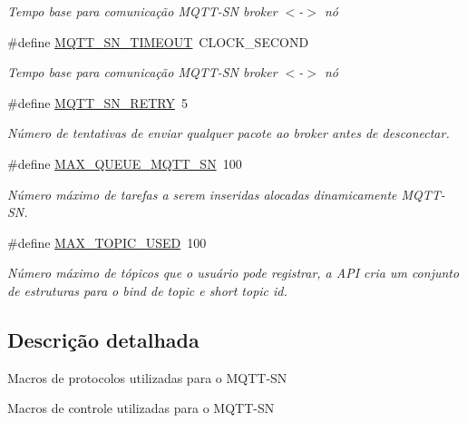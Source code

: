 \begin{DoxyCompactItemize}
\begin{DoxyCompactList}\small\item\em Tempo base para comunicação M\+Q\+T\+T-\/\+S\+N broker $<$-\/$>$ nó \end{DoxyCompactList}\item 
\hypertarget{group__MQTT__SN__CONTROL_ga47da8d46176b160b0db00fe221725d4c}{\#define \hyperlink{group__MQTT__SN__CONTROL_ga47da8d46176b160b0db00fe221725d4c}{M\+Q\+T\+T\+\_\+\+S\+N\+\_\+\+T\+I\+M\+E\+O\+U\+T}~C\+L\+O\+C\+K\+\_\+\+S\+E\+C\+O\+N\+D}\label{group__MQTT__SN__CONTROL_ga47da8d46176b160b0db00fe221725d4c}

\begin{DoxyCompactList}\small\item\em Tempo base para comunicação M\+Q\+T\+T-\/\+S\+N broker $<$-\/$>$ nó \end{DoxyCompactList}\item 
\hypertarget{group__MQTT__SN__CONTROL_gaad5ac7de3008d8fa37447193aebc31e2}{\#define \hyperlink{group__MQTT__SN__CONTROL_gaad5ac7de3008d8fa37447193aebc31e2}{M\+Q\+T\+T\+\_\+\+S\+N\+\_\+\+R\+E\+T\+R\+Y}~5}\label{group__MQTT__SN__CONTROL_gaad5ac7de3008d8fa37447193aebc31e2}

\begin{DoxyCompactList}\small\item\em Número de tentativas de enviar qualquer pacote ao broker antes de desconectar. \end{DoxyCompactList}\item 
\hypertarget{group__MQTT__SN__CONTROL_ga45ab5881e190d570f3784e50be2cce65}{\#define \hyperlink{group__MQTT__SN__CONTROL_ga45ab5881e190d570f3784e50be2cce65}{M\+A\+X\+\_\+\+Q\+U\+E\+U\+E\+\_\+\+M\+Q\+T\+T\+\_\+\+S\+N}~100}\label{group__MQTT__SN__CONTROL_ga45ab5881e190d570f3784e50be2cce65}

\begin{DoxyCompactList}\small\item\em Número máximo de tarefas a serem inseridas alocadas dinamicamente M\+Q\+T\+T-\/\+S\+N. \end{DoxyCompactList}\item 
\hypertarget{group__MQTT__SN__CONTROL_ga5ed98e8fc00194886ebc14d25540f81b}{\#define \hyperlink{group__MQTT__SN__CONTROL_ga5ed98e8fc00194886ebc14d25540f81b}{M\+A\+X\+\_\+\+T\+O\+P\+I\+C\+\_\+\+U\+S\+E\+D}~100}\label{group__MQTT__SN__CONTROL_ga5ed98e8fc00194886ebc14d25540f81b}

\begin{DoxyCompactList}\small\item\em Número máximo de tópicos que o usuário pode registrar, a A\+P\+I cria um conjunto de estruturas para o bind de topic e short topic id. \end{DoxyCompactList}\end{DoxyCompactItemize}


\subsection{Descrição detalhada}
Macros de protocolos utilizadas para o M\+Q\+T\+T-\/\+S\+N

Macros de controle utilizadas para o M\+Q\+T\+T-\/\+S\+N 